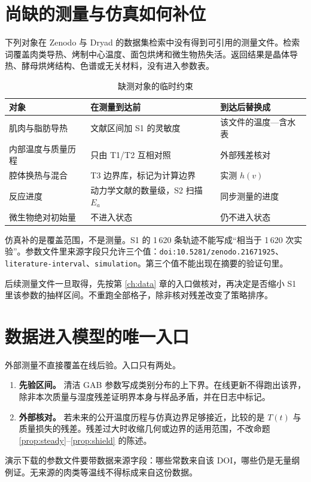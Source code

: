 \section{尚缺的测量与仿真如何补位}

下列对象在 Zenodo 与 Dryad 的数据集检索中没有得到可引用的测量文件。检索词覆盖肉类导热、烤制中心温度、面包烘烤和微生物热失活。返回结果是晶体导热、酵母烘烤结构、色谱或无关材料，没有进入参数表。

\begin{table}[H]
\centering
\caption{缺测对象的临时约束}
\begin{tabularx}{\textwidth}{lXl}
\toprule
对象 & 在测量到达前 & 到达后替换成 \\
\midrule
肌肉与脂肪导热 & 文献区间加 S1 的灵敏度 & 该文件的温度—含水表 \\
内部温度与质量历程 & 只由 T1/T2 互相对照 & 外部残差核对 \\
腔体换热与混合 & T3 边界库，标记为计算边界 & 实测 $h(v)$ \\
反应进度 & 动力学文献的数量级，S2 扫描 $E_a$ & 同步测量的进度 \\
微生物绝对初始量 & 不进入状态 & 仍不进入状态 \\
\bottomrule
\end{tabularx}
\end{table}

仿真补的是覆盖范围，不是测量。S1 的 1\,620 条轨迹不能写成“相当于 1\,620 次实验”。参数文件里来源字段只允许三个值：\texttt{doi:10.5281/zenodo.21671925}、\texttt{literature-interval}、\texttt{simulation}。第三个值不能出现在摘要的验证句里。

后续测量文件一旦取得，先按第 \ref{ch:data} 章的入口做核对，再决定是否缩小 S1 里该参数的抽样区间。不重跑全部格子，除非核对残差改变了策略排序。

\section{数据进入模型的唯一入口}

外部测量不直接覆盖在线后验。入口只有两处。

\begin{enumerate}
\item \textbf{先验区间。} 清洁 GAB 参数写成类别分布的上下界。在线更新不得跑出该界，除非本次质量与湿度残差证明界本身与样品矛盾，并在日志中标记。
\item \textbf{外部核对。} 若未来的公开温度历程与仿真边界足够接近，比较的是 $T(t)$ 与质量损失的残差。残差过大时收缩几何或边界的适用范围，不改命题 \ref{prop:steady}--\ref{prop:shield} 的陈述。
\end{enumerate}

演示下载的参数文件要带数据来源字段：哪些常数来自该 DOI，哪些仍是无量纲例证。无来源的肉类等温线不得标成来自这份数据。
